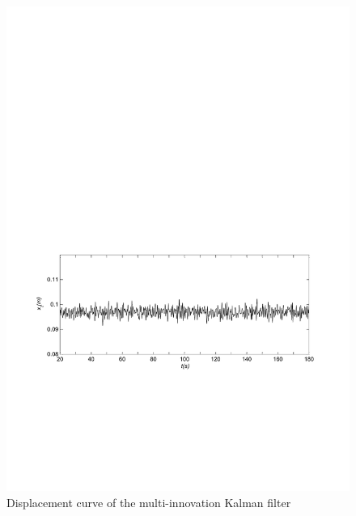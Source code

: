 \begin{figure}[!htb]
  \centering
  \includegraphics[width=\hsize]{MATLAB-multi.pdf}
  \caption{Displacement curve of the multi-innovation Kalman filter}
  \label{fig:multi}
\end{figure}

